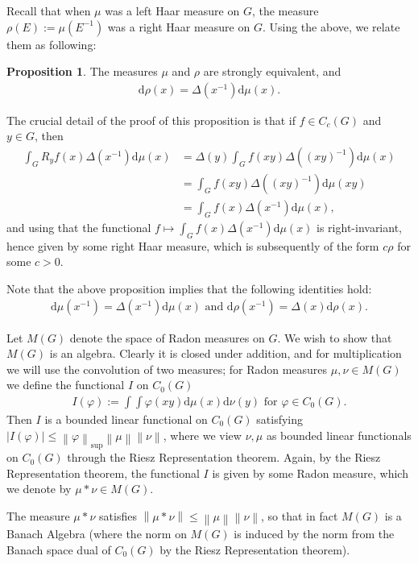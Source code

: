 \documentclass[10pt,twoside,openany,final]{memoir}
\theoremstyle{definition}
\newtheorem{proposition}[theorem]{Proposition}
\theoremstyle{Break}
\newcommand{\lv}{\left\lVert}
\newcommand{\rv}{\right\rVert}
\renewcommand{\d}{\mathrm{d}}
\begin{document}
Recall that when $\mu$ was a left Haar measure on $G$, the measure $\rho(E):=\mu(E^{-1})$ was a right Haar measure on $G$. Using the above, we relate them as following:
\begin{proposition}
	The measures $\mu$ and $\rho$ are strongly equivalent, and 
	\begin{align*}
		\d \rho(x)=  \Delta(x^{-1}) \d \mu(x).
	\end{align*}
\end{proposition}
The crucial detail of the proof of this proposition is that if $f \in C_c(G)$ and $y \in G$, then
\begin{align*}
	\int_G R_y f(x) \Delta(x^{-1}) \d \mu(x) &= \Delta(y) \int_G f(xy) \Delta\left( \left( xy \right)^{-1} \right)\d \mu(x)\\
	&= \int_G f(xy) \Delta\left( \left( xy \right)^{-1} \right)\d \mu(xy)\\
	&= \int_G f(x) \Delta(x^{-1}) \d \mu(x),
\end{align*}
and using that the functional $f \mapsto \int_G f(x) \Delta(x^{-1}) \d \mu(x)$ is right-invariant, hence given by some right Haar measure, which is subsequently of the form $c \rho$ for some $c>0$. 

Note that the above proposition implies that the following identities hold:
\begin{align}
	\d \mu(x^{-1}) = \Delta(x^{-1}) \d \mu(x) \text{  and  } \d \rho(x^{-1}) = \Delta(x)\d \rho(x).
	\label{muxinv}
\end{align}

Let $M(G)$ denote the space of Radon measures on $G$. We wish to show that $M(G)$ is an algebra. Clearly it is closed under addition, and for multiplication we will use the convolution of two measures; for Radon measures $\mu,\nu \in M(G)$ we define the functional $I$ on $C_0(G)$
\begin{align*}
	I(\varphi):= \int \int \varphi(xy) \d \mu(x) \d \nu(y) \text { for } \varphi \in C_0(G).
\end{align*}
Then $I$ is a bounded linear functional on $C_0(G)$ satisfying $|I(\varphi)| \leq \lv \varphi\rv_{\sup} \lv \mu \rv \lv \nu \rv$, where we view $\nu,\mu$ as bounded linear functionals on $C_0(G)$ through the Riesz Representation theorem. Again, by the Riesz Representation theorem, the functional $I$ is given by some Radon measure, which we denote by $\mu \ast \nu \in M(G)$. 

The measure $\mu \ast \nu$ satisfies $\lv \mu \ast \nu \rv \leq \lv \mu \rv \lv \nu \rv$, so that in fact $M(G)$ is a Banach Algebra (where the norm on $M(G)$ is induced by the norm from the Banach space dual of $C_0(G)$ by the Riesz Representation theorem).
\end{document}
